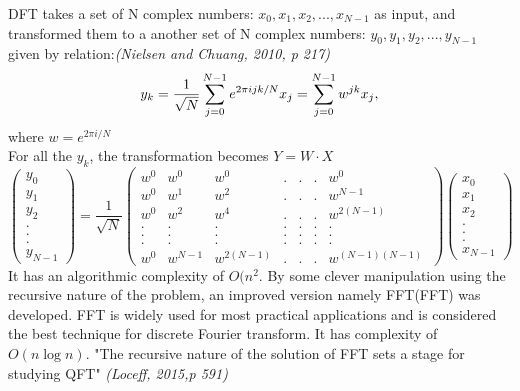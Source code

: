 DFT takes a set of N complex numbers: $x_0, x_1, x_2, ...,x_{N-1}$ as input, and transformed them to a another set of N complex numbers: $y_0, y_1, y_2, ...,y_{N-1}$ given by relation:\cite{Nielsen2002}\emph{(Nielsen and Chuang, 2010, p 217)}\begin{equation}
    \centering
    y_k = \frac{1}{\sqrt{N}}\sum_{j=0}^{N-1} e^{2\pi ijk/N}x_{j} = \sum_{j=0}^{N-1} w^{jk} x_{j},
\end{equation}where $w = e^{2\pi i/N}$\\
For all the $y_k$, the transformation becomes $Y = W\cdot X$
\begin{equation}
    \begin{pmatrix}
        y_0\\y_1 \\y_2\\.\\.\\.\\y_{N-1}
    \end{pmatrix}=\frac{1}{\sqrt{N}}
    \begin{pmatrix}
        w^{0} &w^{0} &w^{0} &. &.&. &w^{0}\\
        w^{0} &w^{1} &w^{2} &. &.&. &w^{N-1}\\
        w^{0} &w^{2} &w^{4} &. &.&. &w^{2(N-1)}\\
        . &. &.&.&.&.&.\\
        . &. &.&.&.&.&.\\
        . &. &.&.&.&.&.\\
        w^{0} &w^{N-1} &w^{2(N-1)}  &. &.&. &w^{(N-1)(N-1)}\
    \end{pmatrix}
    \begin{pmatrix}
         x_0\\x_1 \\x_2\\.\\.\\.\\x_{N-1}
    \end{pmatrix}
\end{equation}
It has an algorithmic complexity of $O(n^{2}$. By some clever manipulation using the recursive nature of the problem, an improved version namely \acrlong{FFT}(\acrshort{FFT}) was developed. \acrshort{FFT} is widely used for most practical applications and is considered the best technique for discrete Fourier transform. It has complexity of $O(n \log{n})$.  "The recursive nature of the solution of \acrshort{FFT} sets a stage for studying QFT"\cite{loceff2015} \emph{(Loceff, 2015,p 591)}

